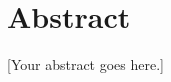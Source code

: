 
\setcounter{page}{2}
\chapter*{Abstract}

[Your abstract goes here.]

\clearpage

\chapter*{}
\thispagestyle{empty}
\clearpage
